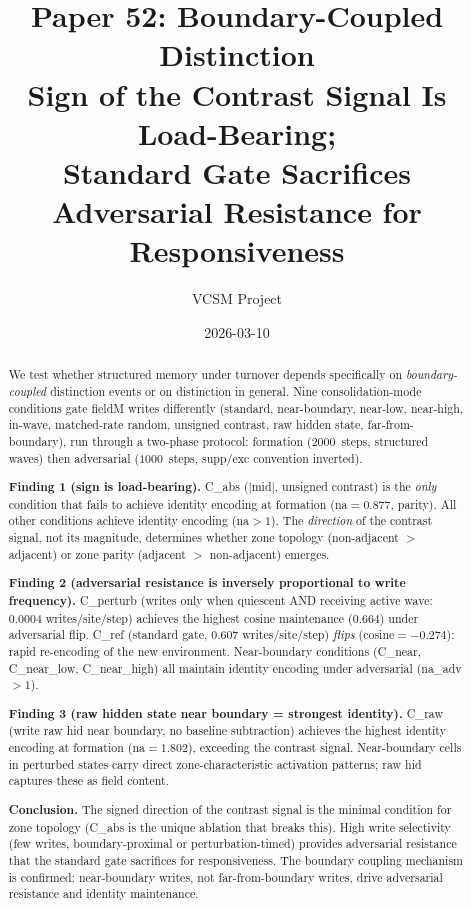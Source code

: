\documentclass[11pt,a4paper]{article}
\title{\textbf{Paper 52: Boundary-Coupled Distinction}\\
\large Sign of the Contrast Signal Is Load-Bearing;\\
Standard Gate Sacrifices Adversarial Resistance for Responsiveness}
\author{VCSM Project}
\date{2026-03-10}
\begin{document}
\maketitle

\begin{abstract}
We test whether structured memory under turnover depends specifically on
\emph{boundary-coupled} distinction events or on distinction in general.
Nine consolidation-mode conditions gate fieldM writes differently
(standard, near-boundary, near-low, near-high, in-wave, matched-rate random,
unsigned contrast, raw hidden state, far-from-boundary),
run through a two-phase protocol: formation ($2000$~steps, structured waves)
then adversarial ($1000$~steps, supp/exc convention inverted).

\textbf{Finding 1 (sign is load-bearing).}
C\_abs ($|$mid$|$, unsigned contrast) is the \emph{only} condition that fails to
achieve identity encoding at formation (na$=0.877$, parity).
All other conditions achieve identity encoding (na$>1$).
The \emph{direction} of the contrast signal, not its magnitude, determines
whether zone topology (non-adjacent $>$ adjacent) or zone parity
(adjacent $>$ non-adjacent) emerges.

\textbf{Finding 2 (adversarial resistance is inversely proportional to write frequency).}
C\_perturb (writes only when quiescent AND receiving active wave: 0.0004 writes/site/step)
achieves the highest cosine maintenance ($0.664$) under adversarial flip.
C\_ref (standard gate, 0.607 writes/site/step) \emph{flips} (cosine$=-0.274$):
rapid re-encoding of the new environment.
Near-boundary conditions (C\_near, C\_near\_low, C\_near\_high) all maintain
identity encoding under adversarial (na\_adv$>1$).

\textbf{Finding 3 (raw hidden state near boundary = strongest identity).}
C\_raw (write raw hid near boundary, no baseline subtraction) achieves the
highest identity encoding at formation (na$=1.802$), exceeding the contrast signal.
Near-boundary cells in perturbed states carry direct zone-characteristic activation
patterns; raw hid captures these as field content.

\textbf{Conclusion.}
The signed direction of the contrast signal is the minimal condition for zone
topology (C\_abs is the unique ablation that breaks this).
High write selectivity (few writes, boundary-proximal or perturbation-timed)
provides adversarial resistance that the standard gate sacrifices for responsiveness.
The boundary coupling mechanism is confirmed: near-boundary writes, not
far-from-boundary writes, drive adversarial resistance and identity maintenance.
\end{abstract}
\end{document}
